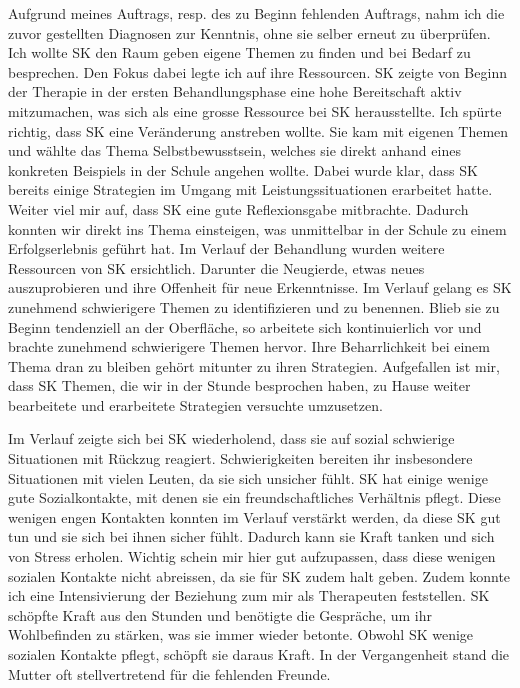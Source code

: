 Aufgrund meines Auftrags, resp. des zu Beginn fehlenden Auftrags, nahm ich die zuvor gestellten Diagnosen zur Kenntnis, ohne sie selber erneut zu überprüfen. Ich wollte SK den Raum geben eigene Themen zu finden und bei Bedarf zu besprechen. Den Fokus dabei legte ich auf ihre Ressourcen. SK zeigte von Beginn der Therapie in der ersten Behandlungsphase eine hohe Bereitschaft aktiv mitzumachen, was sich als eine grosse Ressource bei SK herausstellte. Ich spürte richtig, dass SK eine Veränderung anstreben wollte. Sie kam mit eigenen Themen und wählte das Thema Selbstbewusstsein, welches sie direkt anhand eines konkreten Beispiels in der Schule angehen wollte. Dabei wurde klar, dass SK bereits einige Strategien im Umgang mit Leistungssituationen erarbeitet hatte. Weiter viel mir auf, dass SK eine gute Reflexionsgabe mitbrachte. Dadurch konnten wir direkt ins Thema einsteigen, was unmittelbar in der Schule zu einem Erfolgserlebnis geführt hat. Im Verlauf der Behandlung wurden weitere Ressourcen von SK ersichtlich. Darunter die Neugierde, etwas neues auszuprobieren und ihre Offenheit für neue Erkenntnisse. Im Verlauf gelang es SK zunehmend schwierigere Themen zu identifizieren und zu benennen. Blieb sie zu Beginn tendenziell an der Oberfläche, so arbeitete sich kontinuierlich vor und brachte zunehmend schwierigere Themen hervor. Ihre Beharrlichkeit bei einem Thema dran zu bleiben gehört mitunter zu ihren Strategien. Aufgefallen ist mir, dass SK Themen, die wir in der Stunde besprochen haben, zu Hause weiter bearbeitete und erarbeitete Strategien versuchte umzusetzen.

 Im Verlauf zeigte sich bei SK wiederholend, dass sie auf sozial schwierige Situationen mit Rückzug reagiert. Schwierigkeiten bereiten ihr insbesondere Situationen mit vielen Leuten, da sie sich unsicher fühlt. SK hat einige wenige gute Sozialkontakte, mit denen sie ein freundschaftliches Verhältnis pflegt. Diese wenigen engen Kontakten konnten im Verlauf verstärkt werden, da diese SK gut tun und sie sich bei ihnen sicher fühlt. Dadurch kann sie Kraft tanken und sich von Stress erholen. Wichtig schein mir hier gut aufzupassen, dass diese wenigen sozialen Kontakte nicht abreissen, da sie für SK zudem halt geben. Zudem konnte ich eine Intensivierung der Beziehung zum mir als Therapeuten feststellen. SK schöpfte Kraft aus den Stunden und benötigte die Gespräche, um ihr Wohlbefinden zu stärken, was sie immer wieder betonte. Obwohl SK wenige sozialen Kontakte pflegt, schöpft sie daraus Kraft. In der Vergangenheit stand die Mutter oft stellvertretend für die fehlenden Freunde. 
 
